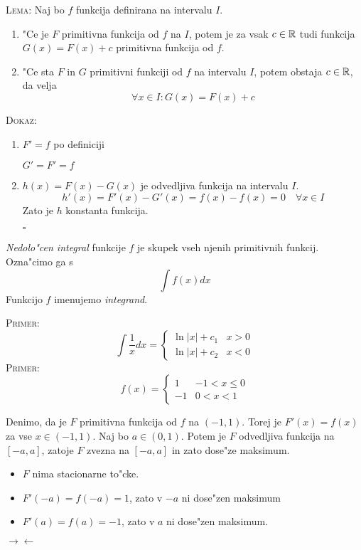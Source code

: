 \textsc{Lema:} Naj bo $f$ funkcija definirana na intervalu $I$.
\begin{enumerate}
	\item "Ce je $F$ primitivna funkcija od $f$ na $I$, potem je za vsak $c \in \mathbb{R}$ tudi funkcija $G(x) = F(x) + c$ primitivna funkcija od $f$.
	\item "Ce sta $F$ in $G$ primitivni funkciji od $f$ na intervalu $I$, potem obstaja $c \in \mathbb{R}$, da velja
	\begin{equation*}
	\forall x \in I: G(x) = F(x) + c
	\end{equation*}
\end{enumerate}
\textsc{Dokaz:}
\begin{enumerate}
	\item $F' = f$ po definiciji
	
	$G' = F' = f$
	
	\item $h(x) = F(x) - G(x)$ je odvedljiva funkcija na intervalu $I$.
	\begin{equation*}
	h'(x) = F'(x) - G'(x) = f(x)  - f(x) = 0 \quad \forall x \in I
	\end{equation*}
	Zato je $h$ konstanta funkcija.
	
	\hfill $\square$
\end{enumerate}
%
 \emph{Nedolo"cen integral} funkcije $f$ je skupek vseh njenih primitivnih funkcij. Ozna"cimo ga s
\begin{equation*}
\int f(x) dx
\end{equation*}
Funkcijo $f$ imenujemo \emph{integrand}.

\textsc{Primer:}
\begin{equation*}
\int \frac{1}{x} dx = \begin{cases}
\ln |x| + c_1 & x > 0 \\
\ln |x| + c_2 & x < 0
\end{cases}
\end{equation*}
%
\textsc{Primer:}
\begin{equation*}
f(x) = \begin{cases}
1 & -1 < x \leq 0 \\
-1 & 0 < x < 1
\end{cases}
\end{equation*}

Denimo, da je $F$ primitivna funkcija od $f$ na $(-1, 1)$. Torej je $F'(x) = f(x)$ za vse $x \in (-1, 1)$. Naj bo $a \in (0, 1)$. Potem je $F$ odvedljiva funkcija na $[-a, a]$, zatoje $F$ zvezna na $[-a, a]$ in zato dose"ze maksimum.
\begin{itemize}
	\item $F$ nima stacionarne to"cke.
	\item $F'(-a) = f(-a) = 1$, zato v $-a$ ni dose"zen maksimum
	\item $F'(a) = f(a) = -1$, zato v $a$ ni dose"zen maksimum.
\end{itemize}
$\rightarrow \leftarrow$


